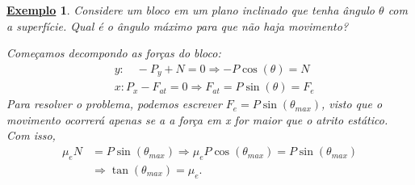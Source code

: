\documentclass{article}
\newtheorem{example}{\underline{Exemplo}}
\begin{document}
 \begin{example}
   Considere um bloco em um plano inclinado que tenha ângulo $\theta $ com a superfície. Qual é o ângulo máximo para que não haja movimento?

   Começamos decompondo as forças do bloco: 
  \begin{align*}
    &y:\quad -P_{y} + N = 0 \Rightarrow -P\cos{(\theta )} = N\\
    &x: P_{x} - F_{at} = 0 \Rightarrow F_{at} = P\sin{(\theta )} = F_{e}
  \end{align*}
  Para resolver o problema, podemos escrever $F_{e} = P\sin{(\theta_{max} )}$, visto que o movimento ocorrerá
  apenas se a a força em x for maior que o atrito estático. Com isso, 
 \begin{align*}
   \mu_{e}N &= P\sin{(\theta_{max})} \Rightarrow \mu_{e}P\cos{(\theta_{max})} = P\sin{(\theta_{max})}\\
            &\Rightarrow \tan{(\theta_{max})} = \mu_{e}.
 \end{align*}
 \end{example}
\end{document}
